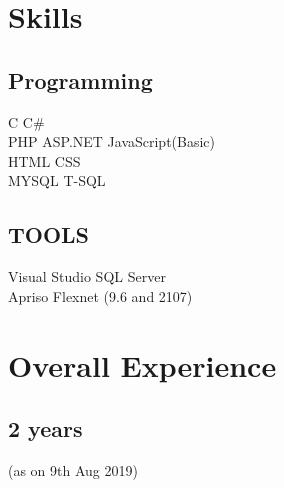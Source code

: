 \documentclass[]{deedy-resume-openfont}
\begin{document}
\begin{minipage}[t]{0.33\textwidth}
\section{Skills}
\subsection{Programming}
C \textbullet{} C\#\\
PHP \textbullet{}ASP.NET \textbullet{}JavaScript(Basic) \\
\textbullet{} HTML \textbullet{} CSS \\ 
MYSQL\textbullet{} T-SQL 

\sectionsep



\subsection{TOOLS}
Visual Studio \textbullet{}   SQL Server \\ \textbullet{}   Apriso Flexnet (9.6 and 2107)

\sectionsep
\section{Overall Experience} 
\subsection {2 years} (as on 9th Aug 2019)
\sectionsep





%
%

\end{minipage} 
\end{document}
